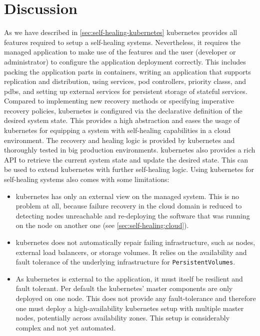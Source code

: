 
\section{Discussion}\label{sec:discussion}
  As we have described in \cref{sec:self-healing-kubernetes} \gls{kubernetes} provides all features required to setup a self-healing systems.
  Nevertheless, it requires the managed application to make use of the features and the user (developer or administrator) to configure the application deployment correctly.
  This includes packing the application parts in containers, writing an application that supports replication and distribution, using \glspl{service}, \glspl{pod controller}, \glspl{priority class}, and \glspl{pdb}, and setting up external services for persistent storage of stateful services.
  Compared to implementing new recovery methods or specifying imperative recovery policies, \gls{kubernetes} is configured via the declarative definition of the desired system state.
  This provides a high abstraction and eases the usage of \gls{kubernetes} for equipping a system with self-healing capabilities in a cloud environment.
  The recovery and healing logic is provided by \gls{kubernetes} and thoroughly tested in big production environments.
  \Gls{kubernetes} also provides a rich API to retrieve the current system state and update the desired state.
  This can be used to extend \gls{kubernetes} with further self-healing logic.
  Using \gls{kubernetes} for self-healing systems also comes with some limitations:
  \begin{itemize}
    \item \gls{kubernetes} has only an external view on the managed system.
      This is no problem at all, because failure recovery in the cloud domain is reduced to detecting nodes unreachable and re-deploying the software that was running on the node on another one (see \cref{sec:self-healing:cloud}).
    \item \gls{kubernetes} does not automatically repair failing infrastructure, such as nodes, external load balancers, or storage volumes.
      It relies on the availability and fault tolerance of the underlying infrastructure for \texttt{PersistentVolumes}.
    \item As \gls{kubernetes} is external to the application, it must itself be resilient and fault tolerant.
      Per default the \gls{kubernetes}' master components are only deployed on one node.
      This does not provide any fault-tolerance and therefore one must deploy a high-availability \gls{kubernetes} setup with multiple master nodes, potentially across availability zones.
      This setup is considerably complex and not yet automated.
  \end{itemize}
